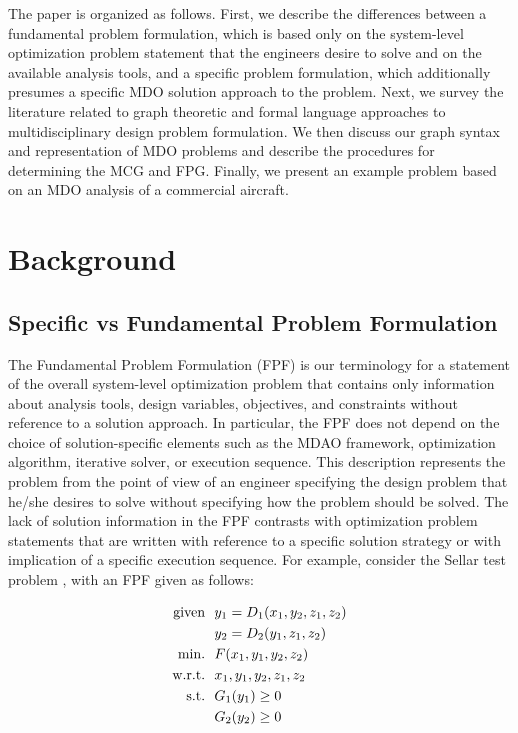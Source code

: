     The paper is organized as follows. First, we describe the differences between a fundamental problem
    formulation, which is based only on the system-level optimization problem statement that the
    engineers desire to solve and on the available analysis tools, and a specific problem formulation, which
    additionally presumes a specific MDO solution approach to the problem. Next, we survey the literature related to
    graph theoretic and formal language approaches to multidisciplinary design problem formulation. 
    We then discuss our graph syntax and representation of MDO problems and describe the procedures for 
    determining the MCG and FPG. Finally, we present an example problem based on an MDO analysis of a 
    commercial aircraft.

\section{Background}
\subsection{Specific vs Fundamental Problem Formulation }
	\label{s:specific vs fundamental}
    The Fundamental Problem Formulation (FPF) is our terminology for a statement of the overall system-level optimization problem that contains only  information about analysis tools, design variables, objectives, and constraints without reference to a solution approach. 
In particular, the FPF does not depend on the choice of solution-specific elements such as the MDAO framework, optimization algorithm, iterative solver, or execution sequence. 
This description represents  the problem from the point of view of an engineer specifying the design problem that he/she desires to solve without specifying how the problem should be solved. 
The lack of solution information in the FPF contrasts with optimization problem statements that are written with reference to a specific solution strategy or with implication of a specific execution sequence. 
For example, consider the Sellar test problem \cite{AIAA:sellar}, with an FPF given as follows:

    \begin{align}
        \textrm{given} & \ \ y_1 = D_1(x_1,y_2,z_1,z_2) \notag
        \\      & \ \ y_2 = D_2(y_1,z_1,z_2) \notag
        \\\textrm{min.} &\ \ F(x_1,y_1,y_2,z_2) \notag
        \\\textrm{w.r.t.} & \ \ x_1,y_1,y_2,z_1,z_2 \notag
        \\\textrm{s.t.} & \ \ G_1(y_1) \geq 0 \notag
        \\     & \ \ G_2(y_2) \geq 0
        \label{eqn:simple_fpf}
    \end{align}

